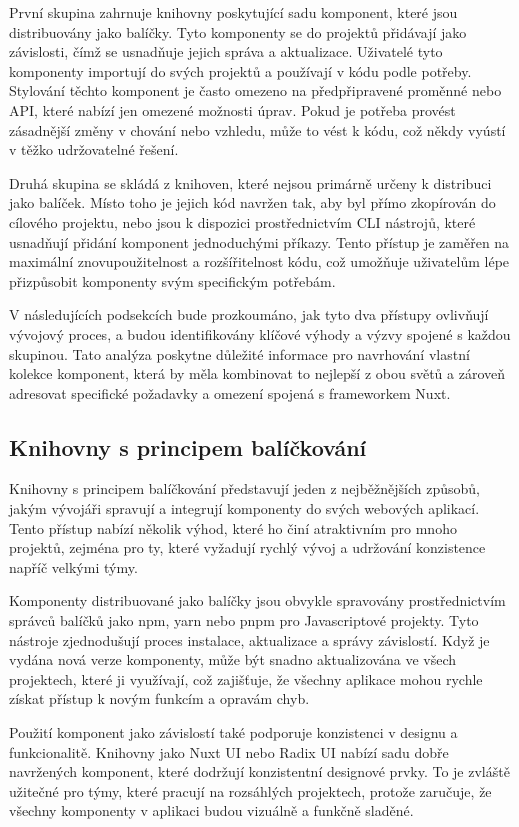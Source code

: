 První skupina zahrnuje knihovny poskytující sadu komponent, které jsou distribuovány jako balíčky. Tyto komponenty se do projektů přidávají jako závislosti, čímž se usnadňuje jejich správa a aktualizace. Uživatelé tyto komponenty importují do svých projektů a používají v kódu podle potřeby. Stylování těchto komponent je často omezeno na předpřipravené proměnné nebo API, které nabízí jen omezené možnosti úprav. Pokud je potřeba provést zásadnější změny v chování nebo vzhledu, může to vést k  kódu, což někdy vyústí v těžko udržovatelné řešení.

Druhá skupina se skládá z knihoven, které nejsou primárně určeny k distribuci jako balíček. Místo toho je jejich kód navržen tak, aby byl přímo zkopírován do cílového projektu, nebo jsou k dispozici prostřednictvím CLI nástrojů, které usnadňují přidání komponent jednoduchými příkazy. Tento přístup je zaměřen na maximální znovupoužitelnost a rozšířitelnost kódu, což umožňuje uživatelům lépe přizpůsobit komponenty svým specifickým potřebám.

V následujících podsekcích bude prozkoumáno, jak tyto dva přístupy ovlivňují vývojový proces, a budou identifikovány klíčové výhody a výzvy spojené s každou skupinou. Tato analýza poskytne důležité informace pro navrhování vlastní kolekce komponent, která by měla kombinovat to nejlepší z obou světů a zároveň adresovat specifické požadavky a omezení spojená s frameworkem Nuxt.

\subsection{Knihovny s principem balíčkování}
Knihovny s principem balíčkování představují jeden z nejběžnějších způsobů, jakým vývojáři spravují a integrují komponenty do svých webových aplikací. Tento přístup nabízí několik výhod, které ho činí atraktivním pro mnoho projektů, zejména pro ty, které vyžadují rychlý vývoj a udržování konzistence napříč velkými týmy.

Komponenty distribuované jako balíčky jsou obvykle spravovány prostřednictvím správců balíčků jako npm, yarn nebo pnpm pro Javascriptové projekty. Tyto nástroje zjednodušují proces instalace, aktualizace a správy závislostí. Když je vydána nová verze komponenty, může být snadno aktualizována ve všech projektech, které ji využívají, což zajišťuje, že všechny aplikace mohou rychle získat přístup k novým funkcím a opravám chyb.

Použití komponent jako závislostí také podporuje konzistenci v designu a funkcionalitě. Knihovny jako Nuxt UI nebo Radix UI nabízí sadu dobře navržených komponent, které dodržují konzistentní designové prvky. To je zvláště užitečné pro týmy, které pracují na rozsáhlých projektech, protože zaručuje, že všechny komponenty v aplikaci budou vizuálně a funkčně sladěné.

